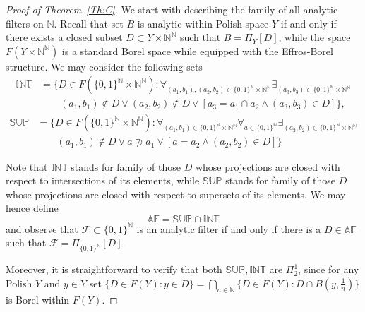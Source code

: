 \documentclass[12pt,fleqn]{amsart}
\newcommand{\IN}{\mathbb{N}}
\newcommand{\FF}{\mathscr{F}}
\theoremstyle{definition}
\theoremstyle{remark}
\begin{document}
\begin{proof}[Proof of Theorem~\ref{Th:C}]
  We start with describing the family of all analytic filters on $\IN$. Recall that set $B$ is analytic within Polish space $Y$ if and only if there exists a closed subset $D\subset Y\times \IN^\IN$ such that $B=\Pi_Y[D]$, while the space $F(Y\times \IN^\IN)$ is a standard Borel space while equipped with the Effros-Borel structure. We may consider the following sets
    \begin{align*}
    \mathbb{INT}
    &=
    \bigg\{D\in F\left(\{0,1\}^\IN\times\IN^\IN\right)\colon    \forall_{(a_1,b_1),(a_2,b_2)\in \{0,1\}^\IN\times\IN^\IN} \exists_{(a_3,b_3)\in \{0,1\}^\IN\times\IN^\IN}
    \\
    &
    \qquad (a_1,b_1)\notin D \vee (a_2,b_2)\notin D \vee \left[ a_3=a_1\cap a_2 \wedge (a_3,b_3)\in D\right] \bigg\},    
    \end{align*}
     \begin{align*}
    \mathbb{SUP}
    &=
    \bigg\{D\in F\left(\{0,1\}^\IN\times\IN^\IN\right)\colon \forall_{(a_1,b_1)\in \{0,1\}^\IN\times\IN^\IN}\forall_{a\in\{0,1\}^\IN} \exists_{(a_2,b_2)\in \{0,1\}^\IN\times\IN^\IN}
   \\
    &\qquad (a_1,b_1)\notin D \vee a\not\supset a_1 \vee \left[a=a_2 \wedge (a_2,b_2) \in D\right]    \bigg\}    
    \end{align*}

Note that $\mathbb{INT}$ stands for family of those $D$ whose projections are closed with respect to intersections of its elements, while $\mathbb{SUP}$ stands for family of those $D$ whose projections are closed with respect to supersets of its elements. We may hence define 
\[\mathbb{AF}=\mathbb{SUP}\cap\mathbb{INT}\]
and observe that $\FF\subset\{0,1\}^\IN$ is an analytic filter if and only if there is a $D\in \mathbb{AF}$ such that $\FF=\Pi_{\{0,1\}^\IN}[D]$.

Moreover, it is straightforward to verify that both $\mathbb{SUP},\mathbb{INT}$ are $\Pi^1_2$, since for any Polish $Y$ and $y\in Y$ set $\{D\in F(Y)\colon y\in D\}=\bigcap_{n\in\IN} \{D\in F(Y)\colon D\cap B(y,\frac1n)\}$ is Borel within $F(Y)$. 


\end{proof}
\end{document}
